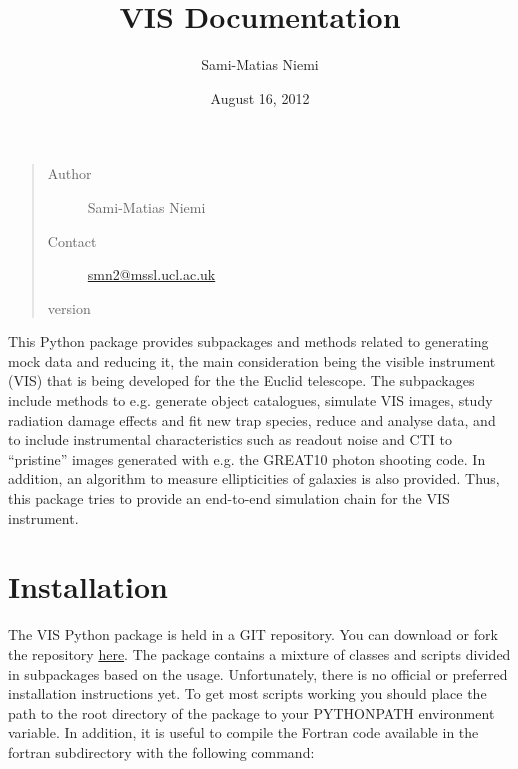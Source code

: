 \documentclass[a4paper,12pt,english]{sphinxmanual}
\title{VIS Documentation}
\date{August 16, 2012}
\author{Sami-Matias Niemi}
\begin{document}
\maketitle
\tableofcontents
{}\label{index::doc}

\begin{quote}\begin{description}
\item[{Author}] \leavevmode
Sami-Matias Niemi

\item[{Contact}] \leavevmode
\href{mailto:smn2@mssl.ucl.ac.uk}{smn2@mssl.ucl.ac.uk}

\item[{version}] 

\end{description}\end{quote}

This Python package provides subpackages and methods related to generating mock data and reducing it, the main
consideration being the visible instrument (VIS) that is being developed for the
the Euclid telescope. The subpackages include methods to e.g. generate object catalogues, simulate VIS images,
study radiation damage effects and fit new trap species, reduce and analyse data, and to include instrumental
characteristics such as readout noise and CTI to ``pristine'' images generated with e.g. the GREAT10 photon
shooting code. In addition, an algorithm to measure ellipticities of galaxies is also provided. Thus,
this package tries to provide an end-to-end simulation chain for the VIS instrument.


\chapter{Installation}
\label{index:installation}\label{index:welcome-to-euclid-visible-instrument-vis-python-package-documentation}
The VIS Python package is held in a GIT repository. You can download or fork the repository
\href{https://bitbucket.org/niemi/vissim-python/overview}{here}. The package contains a mixture of classes
and scripts divided in subpackages based on the usage. Unfortunately, there is no official or preferred
installation instructions yet. To get most scripts working you should place
the path to the root directory of the package to your PYTHONPATH environment variable. In addition, it is
useful to compile the Fortran code available in the fortran subdirectory with the following command:
\end{document}
